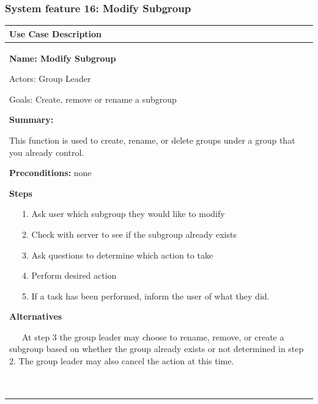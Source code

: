 \documentclass[letterpaper]{article}
\newcommand\textstyleDefaultParagraphFont[1]{#1}
\begin{document}
\subsubsection[System feature 16: Modify Subgroup]{\rmfamily System
feature 16: Modify Subgroup}
\begin{flushleft}
\tablehead{}
\begin{supertabular}{|m{4.98376in}|}
\hline
\bfseries\color{black} Use Case Description\\\hline
{\bfseries\color{black} Name: Modify Subgroup}

{\color{black} Actors: Group Leader}

{\color{black} Goals: Create, remove or rename a subgroup}

{\bfseries\color{black} Summary: }

{\color{black} This function is used to create, rename, or delete groups
under a group that you already control.}

{\color{black} \textstyleDefaultParagraphFont{\textbf{Preconditions:
}}none}

{\bfseries\color{black} Steps}

{\color{black} \ \ \ 1. Ask user which subgroup they would like to
modify}

{\color{black} \ \ \ 2. Check with server to see if the subgroup already
exists}

{\color{black} \ \ \ 3. Ask questions to determine which action to take}

{\color{black} \ \ \ 4. Perform desired action}

{\color{black} \ \ \ 5. If a task has been performed, inform the user of
what they did.}

{\bfseries\color{black} Alternatives}

{\color{black} \ \ \ At step 3 the group leader may choose to rename,
remove, or create a subgroup based on whether the group already exists
or not determined in step 2. The group leader may also cancel the
action at this time.}

~
\\\hline
\end{supertabular}
\end{flushleft}

\bigskip
\end{document}
